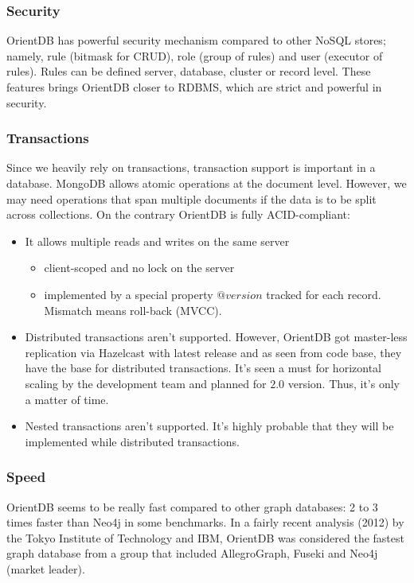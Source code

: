\subsubsection*{Security}

OrientDB has powerful security mechanism compared to other NoSQL stores; namely, rule (bitmask for CRUD), role (group of rules) and user (executor of rules). Rules can be defined server, database, cluster or record level. These features brings OrientDB closer to RDBMS, which are strict and powerful in  security.

\subsubsection*{Transactions}

Since we heavily rely on transactions, transaction support is important in a database. MongoDB allows atomic operations at the document level. However, we may need operations that span multiple documents if the data is to be split across collections. On the contrary OrientDB is fully ACID-compliant:
\begin{itemize}
  \item It allows multiple reads and writes on the same server
    \begin{itemize}
      \item client-scoped and no lock on the server
      \item implemented by a special property $@version$ tracked for each record. Mismatch means roll-back (MVCC).
    \end{itemize}
    \item Distributed transactions aren't supported. However, OrientDB got master-less replication via Hazelcast with latest release and as seen from code base, they have the base for distributed transactions. It's seen a must for horizontal scaling by the development team and planned for $2.0$ version. Thus, it's only a matter of time.
    \item Nested transactions aren't supported. It's highly probable that they will be implemented while distributed transactions.
\end{itemize}

\subsubsection*{Speed}

OrientDB seems to be really fast compared to other graph databases: 2 to 3 times faster than Neo4j in some benchmarks. In a fairly recent analysis (2012) by the Tokyo Institute of Technology and IBM, OrientDB was considered the fastest graph database from a group that included AllegroGraph, Fuseki and Neo4j (market leader).

